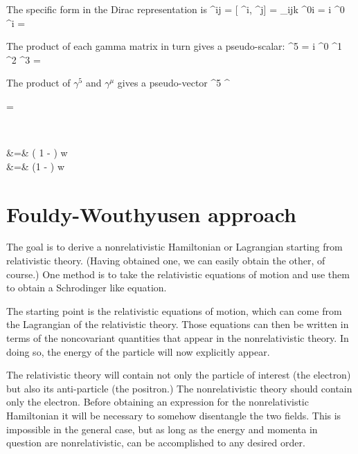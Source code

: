 The specific form in the Dirac representation is
\beq
	\sigma^{ij} =  [ \gamma^i, \gamma^j] 
		= \epsilon_{ijk} 
\eeq
\beq
	\sigma^{0i} = i \gamma^0 \gamma^i 
			= 
\eeq

The product of each gamma matrix in turn gives a pseudo-scalar:
\beq
	\gamma^5 = i \gamma^0 \gamma^1 \gamma^2 \gamma^3 = 
\eeq
 
 The product of $\gamma^5$ and $\gamma^\mu$ gives a pseudo-vector
 \beq
 	\gamma^5 \gamma^\mu 
 \eeq
 
 
 




\beq
	\sr = \begin{pmatrix} \eta \\ \chi \end{pmatrix}
\eeq

\beqa
	\eta &=& \left( 1  -  \right ) w	\\
	\chi &=& 	 \left(1 -  \right ) w	\\
\eeqa







 \section{Fouldy-Wouthyusen approach}
 
The goal is to derive a nonrelativistic Hamiltonian or Lagrangian starting from relativistic theory.  (Having obtained one, we can easily obtain the other, of course.)  One method is to take the relativistic equations of motion and use them to obtain a Schrodinger like equation.

The starting point is the relativistic equations of motion, which can come from the Lagrangian of the relativistic theory.  Those equations can then be written in terms of the noncovariant quantities that appear in the nonrelativistic theory.  In doing so, the energy of the particle will now explicitly appear.

The relativistic theory will contain not only the particle of interest (the electron) but also its anti-particle (the positron.)  The nonrelativistic theory should contain only the electron.  Before obtaining an expression for the nonrelativistic Hamiltonian it will be necessary to somehow disentangle the two fields.  This is impossible in the general case, but as long as the energy and momenta in question are nonrelativistic, can be accomplished to any desired order.


